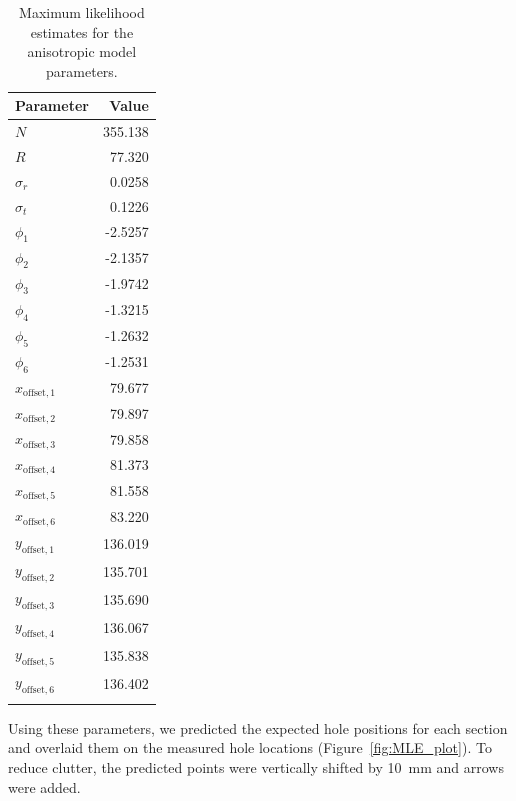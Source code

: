 \documentclass[a4paper,12pt]{article}
\begin{document}
    \begin{longtable}{lr}
        \toprule
        \textbf{Parameter} & \textbf{Value} \\
        \midrule
        \endfirsthead
        
        $N$                        & 355.138 \\
        $R$                        & 77.320 \\
        $\sigma_r$                & 0.0258 \\
        $\sigma_t$                & 0.1226 \\
        $\phi_1$                  & -2.5257 \\
        $\phi_2$                  & -2.1357 \\
        $\phi_3$                  & -1.9742 \\
        $\phi_4$                  & -1.3215 \\
        $\phi_5$                  & -1.2632 \\
        $\phi_6$                  & -1.2531 \\
        $x_{\text{offset},1}$     & 79.677 \\
        $x_{\text{offset},2}$     & 79.897 \\
        $x_{\text{offset},3}$     & 79.858 \\
        $x_{\text{offset},4}$     & 81.373 \\
        $x_{\text{offset},5}$     & 81.558 \\
        $x_{\text{offset},6}$     & 83.220 \\
        $y_{\text{offset},1}$     & 136.019 \\
        $y_{\text{offset},2}$     & 135.701 \\
        $y_{\text{offset},3}$     & 135.690 \\
        $y_{\text{offset},4}$     & 136.067 \\
        $y_{\text{offset},5}$     & 135.838 \\
        $y_{\text{offset},6}$     & 136.402 \\
        \bottomrule
        \caption{Maximum likelihood estimates for the anisotropic model parameters.}
        \label{tab:mle_aniso}
        \end{longtable}
        
    
Using these parameters, we predicted the expected hole positions for each section and overlaid them on the measured hole locations (Figure~\ref{fig:MLE_plot}). To reduce clutter, the predicted points were vertically shifted by 10~mm and arrows were added.
  
\end{document}
